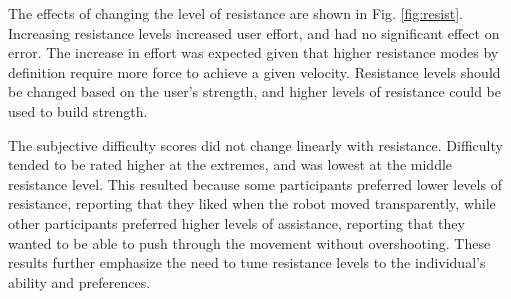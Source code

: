 \documentclass[12pt]{report}
\begin{document}

	
	
	The effects of changing the level of resistance are shown in Fig. \ref{fig:resist}. Increasing resistance levels increased user effort, and had no significant effect on error. The increase in effort was expected given that higher resistance modes by definition require more force to achieve a given velocity. Resistance levels should be changed based on the user's strength, and higher levels of resistance could be used to build strength. 
	
	
	 The subjective difficulty scores did not change linearly with resistance. Difficulty tended to be rated higher at the extremes, and was lowest at the middle resistance level. This resulted because some participants preferred lower levels of resistance, reporting that they liked when the robot moved transparently, while other participants preferred higher levels of assistance, reporting that they wanted to be able to push through the movement without overshooting. These results further emphasize the need to tune resistance levels to the individual's ability and preferences.
	 
\end{document}
